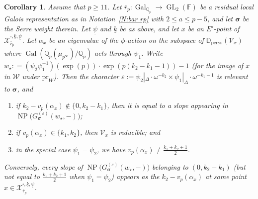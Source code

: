 \documentclass[12pt]{amsart}
\newtheorem{corollary}[subsection]{Corollary}
\theoremstyle{definition}
\numberwithin{equation}{subsection}
\def\calV{\mathcal{V}}
\def\calW{\mathcal{W}}
\def\calX{\mathcal{X}}
\def\DD{\mathbb{D}}
\def\FF{\mathbb{F}}
\def\QQ{\mathbb{Q}}
\DeclareMathOperator{\Gal}{Gal}
\DeclareMathOperator{\GL}{GL}
\DeclareMathOperator{\NP}{NP}
\newcommand{\bbsigma}{\boldsymbol{\sigma}}
\newcommand{\pr}{\mathrm{pr}}
\begin{document}
\begin{corollary}
\label{C:BBE slopes}
Assume that $p \geq 11$.
Let $\bar r_p: \Gal_{\QQ_p} \to \GL_2(\FF)$ be a residual local Galois representation as in Notation~\ref{N:bar rp} with $2 \leq a \leq p-5$, and let $\bbsigma$ be the Serre weight therein. Let $\underline \psi$ and $\underline k$ be as above, and let $x$ be an $E'$-point of $\calX_{\bar r_p}^{\square, \underline k, \underline \psi}$. Let $\alpha_x$ be an eigenvalue of the $\phi$-action on the subspace of $\DD_\mathrm{pcrys}(\calV_x)$ where $\Gal(\QQ_p(\mu_{p^\infty})/\QQ_p)$ acts through $\psi_1$. Write $w_\star: = (\psi_2\psi_1^{-1})(\exp(p))\cdot \exp(p(k_2-k_1-1)) -1$ (for the image of $x$ in $\calW$ under $\pr_W$).
Then the character $\varepsilon := \psi_2|_\Delta \cdot \omega^{-k_2} \times  \psi_1|_\Delta \cdot \omega^{-k_1-1}$ is relevant to $\bbsigma$, and 
\begin{enumerate}
\item if $k_2 - v_p(\alpha_x) \notin\{0, k_2-k_1\}$, then it is equal to a slope appearing in $\NP\big(G_{\bbsigma}^{(\varepsilon)}(w_{\star}, -)\big)$;
\item if $v_p(\alpha_x) \in \{k_1, k_2\}$, then $\calV_x$ is reducible; and
\item in the special case $\psi_1=\psi_2$, we have $v_p(\alpha_x) \neq \frac{k_1+k_2+1}2$.
\end{enumerate}

Conversely, every slope of $\NP\big(G_{\bbsigma}^{(\varepsilon)}(w_{\star}, -)\big)$  belonging to $(0, k_2-k_1)$ (but not equal to $\frac{k_1+k_2+1}2$ when $\psi_1 =\psi_2$) appears as the $k_2-v_p(\alpha_x)$ at some point $x \in \calX_{\bar r_p}^{\square, \underline k, \underline \psi}$.

\end{corollary}
\end{document}

